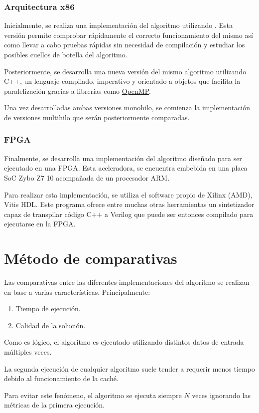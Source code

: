 \subsubsection{Arquitectura x86}

Inicialmente, se realiza una implementación del algoritmo utilizando \Python.
Esta versión permite comprobar rápidamente el correcto funcionamiento del mismo
así como llevar a cabo pruebas rápidas sin necesidad de compilación y
estudiar los posibles cuellos de botella del algoritmo.

Posteriormente, se desarrolla una nueva versión del mismo algoritmo
utilizando C++, un lenguaje compilado, imperativo y orientado a objetos
que facilita la paralelización gracias a librerías como 
\href{https://www.openmp.org/}{OpenMP}\@.

Una vez desarrolladas ambas versiones monohilo,
se comienza la implementación de versiones multihilo
que serán posteriormente comparadas.

\subsubsection{FPGA}

Finalmente, se desarrolla una implementación del algoritmo
diseñado para ser ejecutado en una FPGA\@.
Esta aceleradora, se encuentra embebida en una placa SoC
Zybo Z7 10 acompañada de un procesador ARM\@.

Para realizar esta implementación,
se utiliza el software propio de Xilinx (AMD),
Vitis HDL\@.
Este programa ofrece entre muchas otras herramientas
un sintetizador capaz de transpilar código C++ a Verilog
que puede ser entonces compilado
para ejecutarse en la FPGA\@.

\pagebreak
\section{Método de comparativas}

Las comparativas entre las diferentes implementaciones
del algoritmo se realizan en base a varias características.
Principalmente:

\begin{enumerate}[start=0, itemsep=0.25px]
    \item Tiempo de ejecución.
    \item Calidad de la solución.
\end{enumerate}

Como es lógico, el algoritmo es ejecutado utilizando
distintos datos de entrada múltiples veces.

\begin{notebox}
    La segunda ejecución de cualquier algoritmo suele tender a
    requerir menos tiempo debido al funcionamiento de la caché.
    
    Para evitar este fenómeno, el algoritmo se ejecuta
    siempre $N$ veces ignorando las métricas de la primera ejecución.
\end{notebox}

